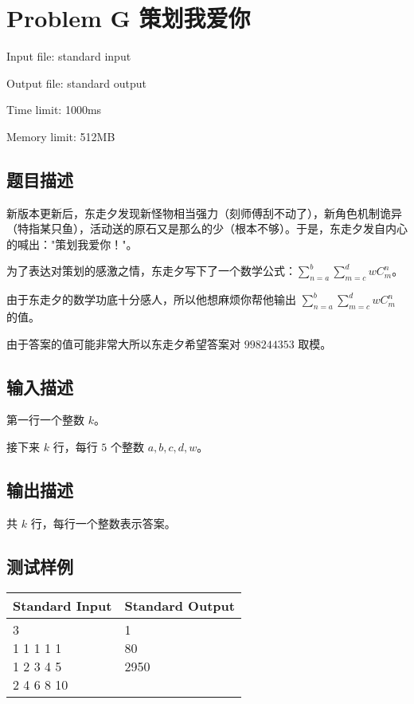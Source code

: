 \newpage
\section{Problem G 策划我爱你}
{ \limitfont{}
Input file: standard input \par
Output file: standard output \par
Time limit: 1000ms \par
Memory limit: 512MB \par
}
\subsection*{题目描述}

新版本更新后，东走夕发现新怪物相当强力（刻师傅刮不动了），新角色机制诡异（特指某只鱼），活动送的原石又是那么的少（根本不够）。于是，东走夕发自内心的喊出："策划我爱你！"。

为了表达对策划的感激之情，东走夕写下了一个数学公式：$\displaystyle \sum^{b}_{n=a}\displaystyle \sum^{d}_{m=c}wC_{m}^{n}$。

由于东走夕的数学功底十分感人，所以他想麻烦你帮他输出 $\displaystyle \sum^{b}_{n=a}\displaystyle \sum^{d}_{m=c}wC_{m}^{n}$ 的值。

由于答案的值可能非常大所以东走夕希望答案对 $998244353$ 取模。

\subsection*{输入描述}

第一行一个整数 $k$。

接下来 $k$ 行，每行 $5$ 个整数 $a,b,c,d,w$。

\subsection*{输出描述}

共 $k$ 行，每行一个整数表示答案。

\subsection*{测试样例}

\begin{table}[H]
\begin{tabularx}{\textwidth}{|X|X|}
    \hline
    \textbf{Standard Input} & \textbf{Standard Output} \\ 
    \hline
    \tablecell{
        3 \\
        1 1 1 1 1 \\
        1 2 3 4 5 \\
        2 4 6 8 10 \\
    } & \tablecell{
        1 \\
        80 \\
        2950 \\
        \\
    } \\
    \hline
\end{tabularx}
\end{table}

